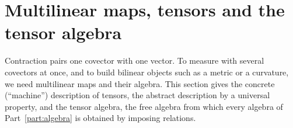 \section{Multilinear maps, tensors and the tensor algebra}\label{sec:tensors}

Contraction pairs one covector with one vector. To measure with several covectors at once, and to build
bilinear objects such as a metric or a curvature, we need multilinear maps and their algebra. This section gives the
concrete (``machine'') description of tensors, the abstract description by a universal property, and the tensor algebra,
the free algebra from which every algebra of Part~\ref{part:algebra} is obtained by imposing relations.






